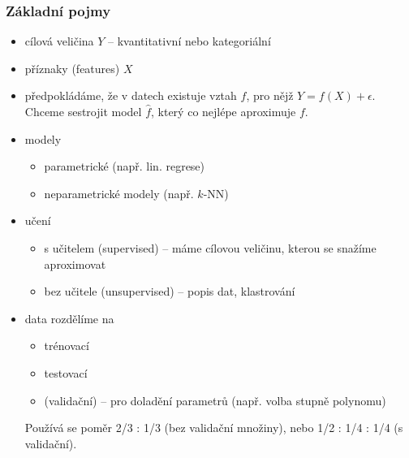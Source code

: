 \documentclass[11pt]{report} %
\numberwithin{equation}{section}
\begin{document}
\subsubsection{Základní pojmy}
\begin{itemize}
	\item cílová veličina $Y$ -- kvantitativní nebo kategoriální
	\item příznaky (features) $X$ 
	\item předpokládáme, že v datech existuje vztah $f$, pro nějž $Y = f(X) + \epsilon$. Chceme sestrojit model $\hat{f}$, který co nejlépe aproximuje $f$. 
	\item modely
	\begin{itemize}
		\item parametrické (např. lin. regrese) 
		\item neparametrické modely (např. $k$-NN)
	\end{itemize}
	
	\item učení
	\begin{itemize}
		\item s učitelem (supervised) -- máme cílovou veličinu, kterou se snažíme aproximovat
		\item bez učitele (unsupervised) -- popis dat, klastrování
	\end{itemize}
	
	\item data rozdělíme na
	\begin{itemize}
		\item trénovací
		\item testovací
		\item (validační) -- pro doladění parametrů (např. volba stupně polynomu)
	\end{itemize}
	Používá se poměr 2/3 : 1/3 (bez validační množiny), nebo 1/2 : 1/4 : 1/4 (s validační).
	

\end{itemize}
\end{document}
